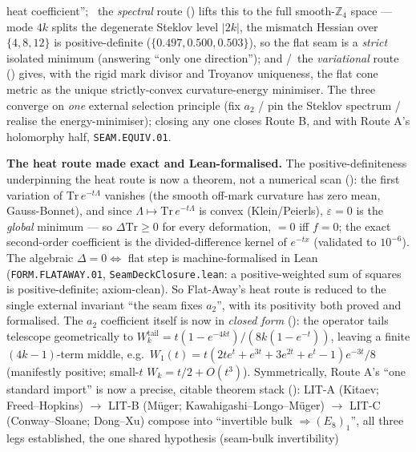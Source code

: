 \documentclass[11pt,a4paper]{article}
\begin{document}
\begin{keybox}
heat coefficient''; \mE\ the \emph{spectral} route () lifts this to
the full smooth-$\mathbb{Z}_4$ space --- mode $4k$ splits the degenerate Steklov level $|2k|$, the mismatch
Hessian over $\{4,8,12\}$ is positive-definite ($\{0.497,0.500,0.503\}$), so the flat seam is a \emph{strict}
isolated minimum (answering ``only one direction''); and \mE/\mC\ the \emph{variational} route
() gives, with the rigid mark divisor and Troyanov uniqueness, the flat cone
metric as the unique strictly-convex curvature-energy minimiser. The three converge on \emph{one} external
selection principle (fix $a_2$ / pin the Steklov spectrum / realise the energy-minimiser); closing any one
closes Route B, and with Route A's holomorphy half, \texttt{SEAM.EQUIV.01}.
\par\smallskip\noindent\textbf{The heat route made exact and Lean-formalised.} The positive-definiteness
underpinning the heat route is now a theorem, not a numerical scan
(): the first variation of $\mathrm{Tr}\,e^{-t\Lambda}$ vanishes (the
smooth off-mark curvature has zero mean, Gauss-Bonnet), and since $\Lambda\mapsto\mathrm{Tr}\,e^{-t\Lambda}$ is
convex (Klein/Peierls), $\varepsilon{=}0$ is the \emph{global} minimum --- so $\Delta\mathrm{Tr}\ge0$ for every
deformation, $=0$ iff $f=0$; the exact second-order coefficient is the divided-difference kernel of $e^{-tx}$
(validated to $10^{-6}$). The algebraic $\Delta{=}0\Leftrightarrow$ flat step is machine-formalised in Lean
(\texttt{FORM.FLATAWAY.01}, \texttt{SeamDeckClosure.lean}: a positive-weighted sum of squares is
positive-definite; axiom-clean). So Flat-Away's heat route is reduced to the single external invariant ``the
seam fixes $a_2$'', with its positivity both proved and formalised.  The $a_2$ coefficient itself is now in
\emph{closed form} (): the operator tails telescope geometrically to
$W_k^{\mathrm{tail}}=t(1-e^{-4kt})/(8k(1-e^{-t}))$, leaving a finite $(4k{-}1)$-term middle, e.g.\
$W_1(t)=t(2t e^{t}+e^{3t}+3e^{2t}+e^{t}-1)e^{-3t}/8$ (manifestly positive; small-$t$ $W_k=t/2+O(t^3)$).
Symmetrically, Route A's ``one standard import'' is now a precise, citable theorem stack
(\veri{v297\_route\_a\_literature\_stack.py}): LIT-A (Kitaev; Freed--Hopkins) $\to$ LIT-B (M\"uger;
Kawahigashi--Longo--M\"uger) $\to$ LIT-C (Conway--Sloane; Dong--Xu) compose into ``invertible bulk
$\Rightarrow(E_8)_1$'', all three legs established, the one shared hypothesis (seam-bulk invertibility)

\end{keybox}
\end{document}
